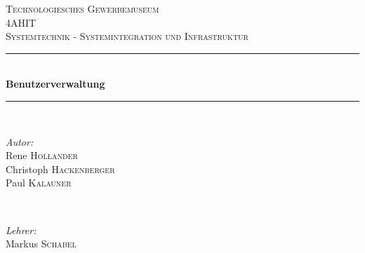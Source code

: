 \documentclass[main.tex]{subfiles}
\begin{document}
\newcommand{\HRule}{\rule{\linewidth}{0.5mm}} %

\center %


\textsc{\LARGE Technologiesches Gewerbemuseum}\\[1.5cm] %
\textsc{\Large 4AHIT}\\[0.5cm] %
\textsc{\large Systemtechnik - Systemintegration und Infrastruktur}\\[0.5cm] %


\HRule \\[0.4cm]
{ \huge \bfseries Benutzerverwaltung} %
\HRule \\[1.5cm]


\begin{minipage}{0.5\textwidth}
	\begin{flushleft} \large
		\emph{Autor:}\\
		Rene \textsc{Hollander}\\
		Christoph \textsc{Hackenberger}\\
		Paul \textsc{Kalauner}
	\end{flushleft}
\end{minipage}
~
\begin{minipage}{0.4\textwidth}
	\begin{flushright} \large
		\emph{Lehrer:} \\
		Markus \textsc{Schabel} %
	\end{flushright}
\end{minipage}\\[2cm]

\end{document}
